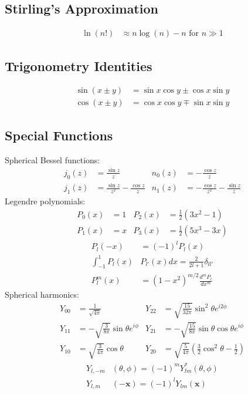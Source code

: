 \documentclass[10pt,twocolumn]{article}
\begin{document}
  \subsection*{Stirling's Approximation}
  \begin{align*}
    \ln(n!) &\approx n\log(n) - n  \text{  for  } n\gg1
  \end{align*}
  \subsection*{Trigonometry Identities}
  \begin{align*}
    \sin(x\pm y) &= \sin x\cos y \pm \cos x\sin y \\
    \cos(x \pm y) &= \cos x\cos y \mp \sin x\sin y
  \end{align*}
  \subsection*{Special Functions}
  Spherical Bessel functions:
  \begin{align*}
    j_0(z) &= \frac{\sin z}{z} &     n_0(z) &= -\frac{\cos z}z \\
    j_1(z) &= \frac{\sin z}{z^2} - \frac{\cos z}z &
    n_1(z) &= -\frac{\cos z}{z^2} - \frac{\sin z}z
  \end{align*}
  Legendre polynomials:
  \begin{align*}
    P_0(x) &= 1 & P_2(x) &= \frac12\left(3x^2-1\right) \\
    P_1(x) &= x & P_3(x) &= \frac12\left(5x^3-3x\right)
  \end{align*}
  \begin{align*}
    P_l(-x) &= (-1)^lP_l(x) \\
     \int_{-1}^1P_l(x)&P_{l'}(x)dx=\frac{2}{2l+1}\delta_{ll'} \\
    P_l^m(x) &= \left(1-x^2\right)^{m/2} \frac{d^mP_l}{dx^m}
  \end{align*}
  Spherical harmonics:
  \begin{align*}
    Y_{00} &= \frac1{\sqrt{4\pi}}
    & Y_{22} &= \sqrt{\frac{15}{32\pi}}\sin^2\theta e^{i2\phi} \\
    Y_{11} &= -\sqrt{\frac{3}{8\pi}}\sin\theta e^{i\phi}
    & Y_{21} &= -\sqrt{\frac{15}{8\pi}}\sin\theta\cos\theta e^{i\phi} \\
    Y_{10} &= \sqrt{\frac{3}{4\pi}}\cos\theta
    & Y_{20} &= \sqrt{\frac{5}{4\pi}}\left( \frac32 \cos^2\theta - \frac12 \right)
  \end{align*}
  \begin{align*}
    Y_{l,-m}&(\theta,\phi) = (-1)^m Y_{lm}^{*}(\theta,\phi) \\
    Y_{l,m}&(-\mathbf{x}) = (-1)^l Y_{lm}(\mathbf{x})
  \end{align*}
\end{document}
